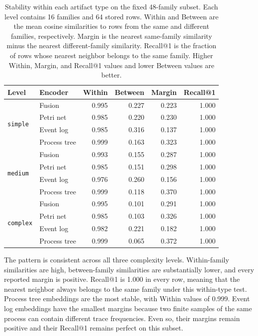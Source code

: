 \documentclass[mathematics,article,submit,moreauthors]{Definitions/mdpi}
\begin{document}
\begin{table}[!t]
\centering
\caption{Stability within each artifact type on the fixed 48-family subset. Each level contains 16 families and 64 stored rows. Within and Between are the mean cosine similarities to rows from the same and different families, respectively. Margin is the nearest same-family similarity minus the nearest different-family similarity. Recall@1 is the fraction of rows whose nearest neighbor belongs to the same family. Higher Within, Margin, and Recall@1 values and lower Between values are better.}
\label{tab:invariance}
\begin{tabular}{@{}llrrrr@{}}
\toprule
Level & Encoder & Within & Between & Margin & Recall@1 \\
\midrule
\multirow{4}{*}{\texttt{simple}} & Fusion & 0.995 & 0.227 & 0.223 & 1.000 \\
 & Petri net & 0.985 & 0.220 & 0.230 & 1.000 \\
 & Event log & 0.985 & 0.316 & 0.137 & 1.000 \\
 & Process tree & 0.999 & 0.163 & 0.323 & 1.000 \\
\midrule
\multirow{4}{*}{\texttt{medium}} & Fusion & 0.993 & 0.155 & 0.287 & 1.000 \\
 & Petri net & 0.985 & 0.151 & 0.298 & 1.000 \\
 & Event log & 0.976 & 0.260 & 0.156 & 1.000 \\
 & Process tree & 0.999 & 0.118 & 0.370 & 1.000 \\
\midrule
\multirow{4}{*}{\texttt{complex}} & Fusion & 0.995 & 0.101 & 0.291 & 1.000 \\
 & Petri net & 0.985 & 0.103 & 0.326 & 1.000 \\
 & Event log & 0.982 & 0.221 & 0.182 & 1.000 \\
 & Process tree & 0.999 & 0.065 & 0.372 & 1.000 \\
\bottomrule
\end{tabular}
\end{table}

The pattern is consistent across all three complexity levels. Within-family similarities are high, between-family similarities are substantially lower, and every reported margin is positive. Recall@1 is 1.000 in every row, meaning that the nearest neighbor always belongs to the same family under this within-type test. Process tree embeddings are the most stable, with Within values of 0.999. Event log embeddings have the smallest margins because two finite samples of the same process can contain different trace frequencies. Even so, their margins remain positive and their Recall@1 remains perfect on this subset.
\end{document}

